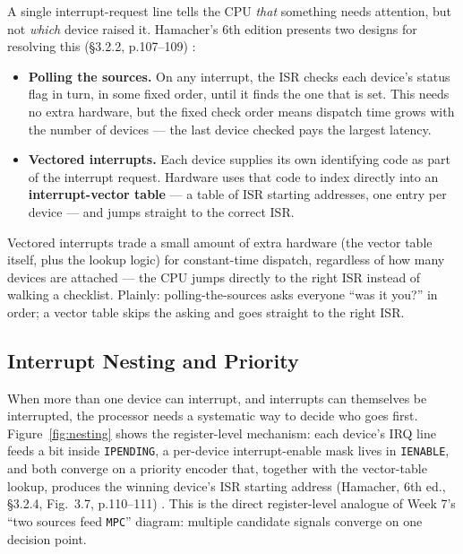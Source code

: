 \documentclass[11pt]{article}
\begin{document}
A single interrupt-request line tells the CPU \emph{that} something needs attention, but not \emph{which} device raised it. Hamacher's 6th edition presents two designs for resolving this (\S3.2.2, p.107--109) \cite{Hamacher2002_computer_organization}:

\begin{itemize}
  \item \textbf{Polling the sources.} On any interrupt, the ISR checks each device's status flag in turn, in some fixed order, until it finds the one that is set. This needs no extra hardware, but the fixed check order means dispatch time grows with the number of devices --- the last device checked pays the largest latency.
  \item \textbf{Vectored interrupts.} Each device supplies its own identifying code as part of the interrupt request. Hardware uses that code to index directly into an \textbf{interrupt-vector table} --- a table of ISR starting addresses, one entry per device --- and jumps straight to the correct ISR.
\end{itemize}

Vectored interrupts trade a small amount of extra hardware (the vector table itself, plus the lookup logic) for constant-time dispatch, regardless of how many devices are attached --- the CPU jumps directly to the right ISR instead of walking a checklist. Plainly: polling-the-sources asks everyone ``was it you?'' in order; a vector table skips the asking and goes straight to the right ISR.

\subsection{Interrupt Nesting and Priority}

When more than one device can interrupt, and interrupts can themselves be interrupted, the processor needs a systematic way to decide who goes first. Figure~\ref{fig:nesting} shows the register-level mechanism: each device's IRQ line feeds a bit inside \texttt{IPENDING}, a per-device interrupt-enable mask lives in \texttt{IENABLE}, and both converge on a priority encoder that, together with the vector-table lookup, produces the winning device's ISR starting address (Hamacher, 6th ed., \S3.2.4, Fig.~3.7, p.110--111) \cite{Hamacher2002_computer_organization}. This is the direct register-level analogue of Week 7's ``two sources feed \texttt{MPC}'' diagram: multiple candidate signals converge on one decision point.
\end{document}
